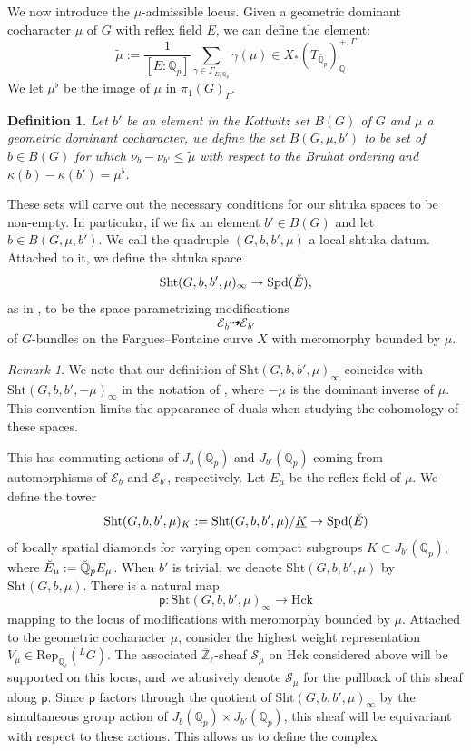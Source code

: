 \documentclass[reqno,11pt]{amsart}
\newtheorem{definition}[theorem]{Definition}
\theoremstyle{remark}
\newtheorem{remark}[theorem]{Remark}
\newcommand{\Sht}{\mathrm{Sht}}
\newcommand{\Spd}{\mathrm{Spd}}
\newcommand{\Rep}{\mathrm{Rep}}
\def\ol{\overline}
\def\ra{\rightarrow}
\begin{document}
We now introduce the $\mu$-admissible locus. Given a geometric dominant cocharacter $\mu$ of $G$ with reflex field $E$, we can define the element:
\[ \tilde{\mu} := \frac{1}{[E:\mathbb{Q}_{p}]} \sum_{\gamma \in \Gamma_{E/\mathbb{Q}_{p}}} \gamma(\mu) \in X_*(T_{\overline{\mathbb{Q}}_{p}})^{+,\Gamma}_{\mathbb{Q}} \]
We let $\mu^{\flat}$ be the image of $\mu$ in $\pi_1(G)_{\Gamma}$.
\begin{definition}{\label{shiftedbgu}}
Let $b'$ be an element in the Kottwitz set $B(G)$ of $G$ and $\mu$ a geometric dominant cocharacter, we define the set $B(G,\mu,b')$ to be set of $b \in B(G)$ for which $\nu_{b} - \nu_{b'} \leq \tilde{\mu}$  with respect to the Bruhat ordering and $\kappa(b) - \kappa(b') = \mu^{\flat}$. 
\end{definition}
These sets will carve out the necessary conditions for our shtuka spaces to be non-empty. In particular, if we fix an element $b' \in B(G)$ and let $b \in B(G,\mu,b')$. We call the quadruple $(G,b,b',\mu)$ a local shtuka datum. Attached to it, we define the shtuka space
\[ \Sht(G,b,b',\mu)_{\infty} \rightarrow \Spd(\Breve{E}), \]
as in \cite{SW}, to be the space parametrizing modifications 
\[  \mathcal{E}_{b} \dashrightarrow \mathcal{E}_{b'} \]
of $G$-bundles on the Fargues--Fontaine curve $X$ with meromorphy bounded by $\mu$.
\begin{remark}
We note that our definition of $\Sht(G,b,b',\mu)_{\infty}$ coincides with $\Sht(G,b,b',-\mu)_{\infty}$ in the notation of \cite{SW}, where $-\mu$ is the dominant inverse of $\mu$. This convention limits the appearance of duals when studying the cohomology of these spaces.  
\end{remark}
This has commuting actions of $J_{b}(\mathbb{Q}_{p})$ and $J_{b'}(\mathbb{Q}_{p})$ coming from automorphisms of $\mathcal{E}_{b}$ and $\mathcal{E}_{b'}$, respectively. Let $E_{\mu}$ be the reflex field of $\mu$. We define the tower 
\[ \Sht(G,b,b',\mu)_{K} := \Sht(G,b,b',\mu)/\underline{K} \ra \Spd(\Breve{E}) \] of locally spatial diamonds \cite[Theorem~23.1.4]{SW}
for varying open compact subgroups $K \subset J_{b'}(\mathbb{Q}_{p})$, where $\Breve{E}_{\mu} := \Breve{\mathbb{Q}}_{p}E_{\mu}$. When $b'$ is trivial, we denote $\Sht(G,b,b',\mu)$ by $\Sht(G,b,\mu)$. 
There is a natural map 
\[ \mathsf{p}: \Sht(G,b,b',\mu)_{\infty} \ra \mathrm{Hck} \] 
mapping to the locus of modifications with meromorphy bounded by $\mu$. Attached to the geometric cocharacter $\mu$, consider the highest weight representation $V_{\mu} \in \Rep_{\ol{\mathbb{Q}}_{\ell}}(\phantom{}^{L}G)$. The associated $\ol{\mathbb{Z}}_{\ell}$-sheaf  $\mathcal{S}_{\mu}$ on $\mathrm{Hck}$ considered above will be supported on this locus, and we abusively denote $\mathcal{S}_{\mu}$ for the pullback of this sheaf along $\mathsf{p}$. Since $\mathsf{p}$ factors through the quotient of $\Sht(G,b,b',\mu)_{\infty}$ by the simultaneous group action of $J_{b}(\mathbb{Q}_{p}) \times J_{b'}(\mathbb{Q}_{p})$, this sheaf will be equivariant with respect to these actions. This allows us to define the complex
\end{document}

